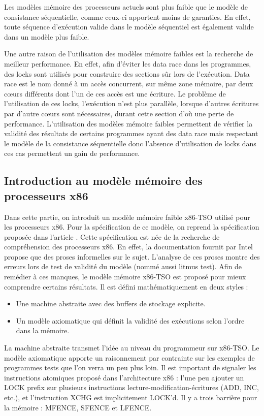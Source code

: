 \documentclass[12pt,a4paper]{article}
\begin{document}
Les modèles mémoire des processeurs actuels sont plus faible que le modèle de consistance séquentielle, comme ceux-ci apportent moins de garanties. En effet, toute séquence d'exécution valide dans le modèle séquentiel est également valide dans un modèle plus faible.

Une autre raison de l'utilisation des modèles mémoire faibles est la recherche de meilleur performance. En effet, afin d'éviter les data race dans les programmes, des locks sont utilisés pour construire des sections sûr lors de l'exécution. Data race est le nom donné à un accès concurrent, sur même zone mémoire, par deux cœurs différents dont l'un de ces accès est une écriture. Le problème de l'utilisation de ces locks, l'exécution n'est plus parallèle, lorsque d'autres écritures par d'autre cœurs sont nécessaires, durant cette section d'où une perte de performance. L'utilisation des modèles mémoire faibles permettent de vérifier la validité des résultats de certains programmes ayant des data race mais respectant le modèle de la consistance séquentielle donc l'absence d'utilisation de locks dans ces cas permettent un gain de performance.  

\subsection{Introduction au modèle mémoire des processeurs x86}
 
Dans cette partie, on introduit un modèle mémoire faible x86-TSO utilisé pour les processeurs x86. Pour la spécification de ce modèle, on reprend la spécification proposée dans l'article \cite{Sewell:2010:XRU:1785414.1785443}. Cette spécification est née de la recherche de compréhension des processeurs x86. En effet, la documentation fournit par Intel propose que des proses informelles sur le sujet. L'analyse de ces proses montre des erreurs lors de test de validité du modèle (nommé aussi litmus test). Afin de remédier à ces manques, le modèle mémoire x86-TSO est proposé pour mieux comprendre certains résultats. Il est défini mathématiquement en deux styles :
\begin{itemize}
	\item Une machine abstraite avec des buffers de stockage explicite.
	\item Un modèle axiomatique qui définit la validité des exécutions selon l'ordre dans la mémoire. 
\end{itemize}
La machine abstraite transmet l'idée au niveau du programmeur sur x86-TSO. Le modèle axiomatique apporte un raisonnement par contrainte sur les exemples de programmes tests que l'on verra un peu plus loin. Il est important de signaler les instructions atomiques proposé dans l'architecture x86 : l'une peu ajouter un LOCK prefix sur plusieurs instructions lecture-modification-écritures (ADD, INC, etc.), et l'instruction XCHG est implicitement LOCK'd. Il y a trois barrière pour la mémoire : MFENCE, SFENCE et LFENCE.
\end{document}
